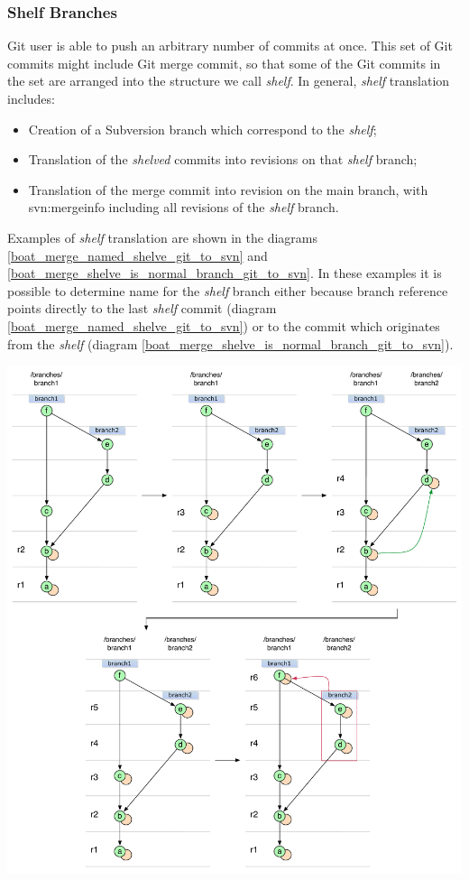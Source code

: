 \subsubsection{Shelf Branches}
\label{shelf_branches}

Git user is able to push an arbitrary number of commits at once. This set of Git commits might include Git merge commit, 
so that some of the Git commits in the set are arranged into the structure we call \emph{shelf}. In general, \emph{shelf}
translation includes:
\begin{itemize}
\item Creation of a Subversion branch which correspond to the \emph{shelf};
\item Translation of the \emph{shelved} commits into revisions on that \emph{shelf} branch;
\item Translation of the merge commit into revision on the main branch, with svn:mergeinfo including all revisions
of the \emph{shelf} branch.
\end{itemize}
Examples of \emph{shelf} translation are shown in the diagrams \ref{boat_merge_named_shelve_git_to_svn} and \ref{boat_merge_shelve_is_normal_branch_git_to_svn}.
In these examples it is possible to determine name for the \emph{shelf} branch either because branch reference points directly to the 
last \emph{shelf} commit (diagram \ref{boat_merge_named_shelve_git_to_svn}) or to the commit which originates from the \emph{shelf} (diagram \ref{boat_merge_shelve_is_normal_branch_git_to_svn}).
\begin{center}
\includegraphics[width=\textwidth]{img/diagrams/boat_merge_named_shelve_git_to_svn.pdf}%
\label{boat_merge_named_shelve_git_to_svn}%
\end{center}
